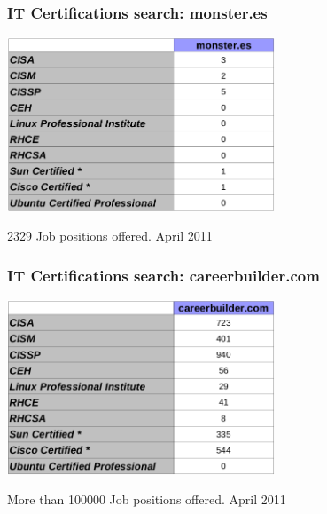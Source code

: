 \documentclass{beamer}
\begin{document}

\begin{frame}
\frametitle{IT Certifications search: monster.es}
\begin{center}
  \includegraphics[width=8cm]{figs/monster.png}
\end{center}
\begin{center}
\normalsize{2329 Job positions offered. April 2011}
\end{center}
\end{frame}



\begin{frame}
\frametitle{IT Certifications search: careerbuilder.com}
\begin{center}
  \includegraphics[width=8cm]{figs/careerbuilder.png}
\end{center}
\begin{center}
\normalsize{More than 100000 Job positions offered. April 2011}
\end{center}
\end{frame}


\end{document}
